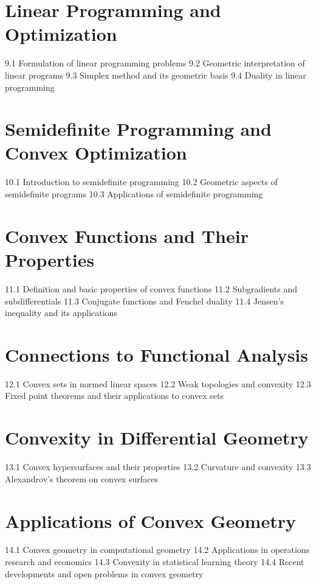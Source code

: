 \section{Linear Programming and Optimization}
9.1 Formulation of linear programming problems
9.2 Geometric interpretation of linear programs
9.3 Simplex method and its geometric basis
9.4 Duality in linear programming
\section{Semidefinite Programming and Convex Optimization}
10.1 Introduction to semidefinite programming
10.2 Geometric aspects of semidefinite programs
10.3 Applications of semidefinite programming
\section{Convex Functions and Their Properties}
11.1 Definition and basic properties of convex functions
11.2 Subgradients and subdifferentials
11.3 Conjugate functions and Fenchel duality
11.4 Jensen's inequality and its applications
\section{Connections to Functional Analysis}
12.1 Convex sets in normed linear spaces
12.2 Weak topologies and convexity
12.3 Fixed point theorems and their applications to convex sets
\section{Convexity in Differential Geometry}
13.1 Convex hypersurfaces and their properties
13.2 Curvature and convexity
13.3 Alexandrov's theorem on convex surfaces
\section{Applications of Convex Geometry}
14.1 Convex geometry in computational geometry
14.2 Applications in operations research and economics
14.3 Convexity in statistical learning theory
14.4 Recent developments and open problems in convex geometry
